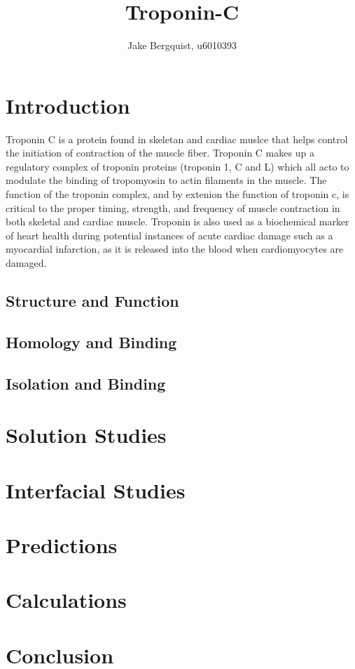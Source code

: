 \documentclass[12pt]{article}
\begin{document}
\title{Troponin-C }
\author{Jake Bergquist, u6010393 }
\maketitle

\section{Introduction}
Troponin C is a protein found in skeletan and cardiac muslce that helps control the initiation of contraction of the muscle fiber. Troponin C makes up a regulatory complex of troponin proteins (troponin 1, C and L) which all acto to modulate the binding of tropomyosin to actin filaments in the muscle. The function of the troponin complex, and by extenion the function of troponin c, is critical to the proper timing, strength, and frequency of muscle contraction in both skeletal and cardiac muscle. Troponin is also used as a biochemical marker of heart health during potential instances of acute cardiac damage such as a myocardial infarction, as it is released into the blood when cardiomyocytes are damaged. 

\subsection{Structure and Function}


\subsection{Homology and Binding}


\subsection{Isolation and Binding}


\section{Solution Studies}


\section{Interfacial Studies}


\section{Predictions}


\section{Calculations}


\section{Conclusion}


%
%
\end{document}
